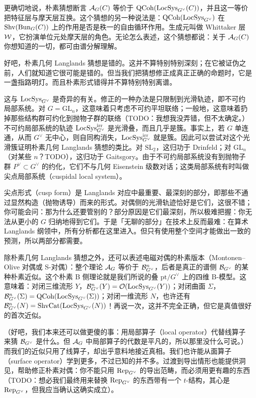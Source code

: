 更确切地说，朴素猜想断言 $\mathcal{A}_G(C)$ 等价于 $\mathrm{QCoh}(\mathrm{LocSys}_{G^\vee}(C))$，并且这一等价把特征层与摩天层互换。这个猜想的另一种说法是：$\mathrm{QCoh}(\mathrm{LocSys}_{G^\vee})$ 在 $\mathrm{Shv}(\mathrm{Bun}_G(C))$ 上的作用是否是秩一的自由循环作用。生成元叫做 Whittaker 层 $\mathcal{W}$，它扮演单位元处摩天层的角色。无论怎么表述，这个猜想都说：关于 $\mathcal{A}_G(C)$ 你想知道的一切，都可由谱分解理解。

好吧，朴素几何 Langlands 猜想是错的。这并不算特别特别深刻；在它被证伪之前，人们就知道它很可能是错的。但当我们把猜想修正成真正正确的命题时，它是一盏指路明灯。而且朴素形式错得并不算特别特别离谱。

这与 $\mathrm{LocSys}_{G^\vee}$ 是奇异的有关。修正的一种办法是只限制到光滑轨迹，即不可约局部系统。对 $G=\mathrm{GL}_n$，这意味着只考虑不可约平坦联络；一般地，这意味着扔掉那些结构群可约化到抛物子群的联络（TODO：我想我没弄错，但不太确定。）不可约局部系统的轨迹 $\mathrm{LocSys}^{\mathrm{irr}}_{G^\vee}$ 是光滑叠，而且几乎是簇。事实上，若 $G$ 单连通，从而 $G^\vee$ 无中心，则自同构消失，$\mathrm{LocSys}^{\mathrm{irr}}_{G^\vee}$ 就是簇。因此可以尝试对这个光滑簇证明朴素几何 Langlands 猜想的类比。对 $\mathrm{SL}_2$，这归功于 Drinfeld；对 $\mathrm{GL}_n$（对某些 $n$？TODO），这归功于 Gaitsgory。由于不可约局部系统没有到抛物子群 $P^\vee\subset G^\vee$ 的约化，它们不与几何 Eisenstein 级数对话；这类局部系统有时叫做尖点局部系统（cuspidal local system）。

尖点形式（cusp form）是 Langlands 对应中最重要、最深刻的部分，即那些不通过显然构造（抛物诱导）而来的形式。对偶侧的光滑轨迹恰好是它们，这很不错；你可能会问：那为什么还要管别的？部分原因是它们最深刻，所以极难把握：你无法从更小的 $G$ 归纳地得到它们。于是「无聊的部分」在技术上反而最难：在算术 Langlands 纲领中，所有分析都在这里进入。但只有使用整个空间才能做出一致的预测，所以两部分都需要。

除朴素几何 Langlands 猜想之外，还可以表述电磁对偶的朴素版本（Montonen–Olive 对偶或 S-对偶）：整个理论 $\mathcal{A}_G$ 等价于 $\mathcal{B}^n_{G^\vee}$，后者是真正的谱侧 $\mathcal{B}_{G^\vee}$ 的某种朴素近似。这个朴素 B 侧理论就是我们所说的叠 $\mathrm{pt}/G^\vee$ 上的四维 B-模型。这意味着：对闭三维流形 $Y$，$\mathcal{B}^n_{G^\vee}(Y)=\mathcal{O}(\mathrm{LocSys}_{G^\vee}(Y))$；对闭曲面 $\Sigma$，$\mathcal{B}^n_{G^\vee}(\Sigma)=\mathrm{QCoh}(\mathrm{LocSys}_{G^\vee}(\Sigma))$；对闭一维流形 $N$，也许还有 $\mathcal{B}^n_{G^\vee}(N)=\mathrm{ShvCat}(\mathrm{LocSys}_{G^\vee}(N))$！再说一次，这并不完全正确，但它是真值很好的首次近似。


（好吧，我们本来还可以做更傻的事：用局部算子（local operator）代替线算子来猜 $\mathcal{B}_{G^\vee}$ 是什么。但 $\mathcal{A}_G$ 中局部算子的代数是平凡的，所以那里没什么可说。）而我们的近似只用了线算子，却出乎意料地接近真相。我们也许能从面算子（surface operator）学到更多，不过已知的并不多。过渡到导出情形也能提供洞见，帮助修正朴素对偶：你不能只用 $\operatorname{Rep}_{G^\vee}$ 的导出范畴，而必须用更有趣的东西（TODO：想必我们最终用来替换 $\operatorname{Rep}_{G^\vee}$ 的东西带有一个 $t$-结构，其心是 $\operatorname{Rep}_{G^\vee}$，但我应当确认这确实成立）。

